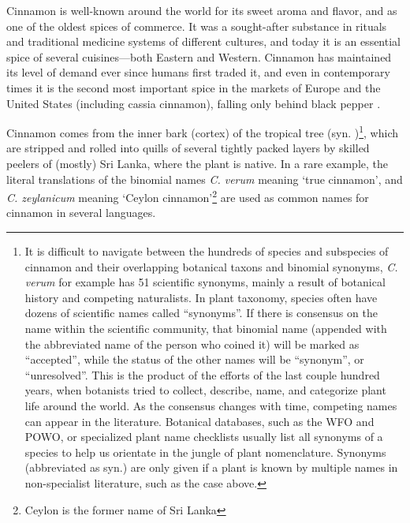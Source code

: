 Cinnamon is well-known around the world for its sweet aroma and flavor, and as one of the oldest spices of commerce. It was a sought-after substance in rituals and traditional medicine systems of different cultures, and today it is an essential spice of several cuisines---both Eastern and Western. Cinnamon has maintained its level of demand ever since humans first traded it, and even in contemporary times it is the second most important spice in the markets of Europe and the United States (including cassia cinnamon), falling only behind black pepper \autocite[]{ravindran_cinnamon_2004}.

Cinnamon comes from the inner bark (cortex) of the tropical tree  (syn. )\footnote{It is difficult to navigate between the hundreds of species and subspecies of cinnamon and their overlapping botanical taxons and binomial synonyms, \textit{C. verum} for example has 51 scientific synonyms, mainly a result of botanical history and competing naturalists. In plant taxonomy, species often have dozens of scientific names called ``synonyms''. If there is consensus on the name within the scientific community, that binomial name (appended with the abbreviated name of the person who coined it) will be marked as ``accepted'', while the status of the other names will be ``synonym'', or ``unresolved''. This is the product of the efforts of the last couple hundred years, when botanists tried to collect, describe, name, and categorize plant life around the world. As the consensus changes with time, competing names can appear in the literature. Botanical databases, such as the \gls{WFO} and \gls{POWO}, or specialized plant name checklists usually list all synonyms of a species to help us orientate in the jungle of plant nomenclature. Synonyms (abbreviated as syn.) are only given if a plant is known by multiple names in non-specialist literature, such as the case above.}, which are stripped and rolled into quills of several tightly packed layers by skilled peelers of (mostly) Sri Lanka, where the plant is native. In a rare example, the literal translations of the binomial names \textit{C. verum} meaning `true cinnamon', and \textit{C. zeylanicum} meaning `Ceylon cinnamon'\footnote{Ceylon is the former name of Sri Lanka} are used as common names for cinnamon in several languages. 




